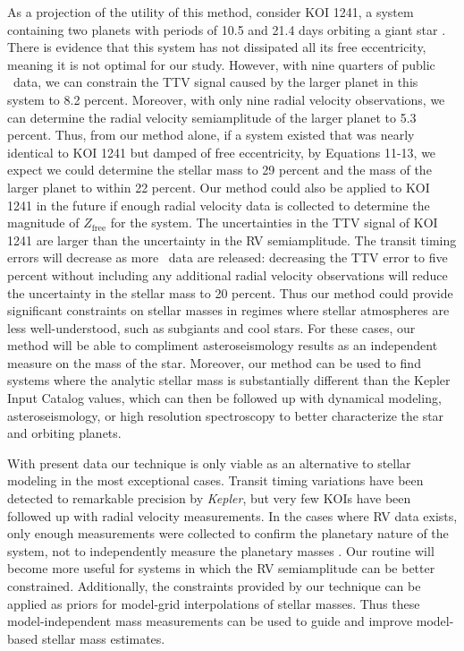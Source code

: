 As a projection of the utility of this method, consider KOI 1241, a system containing two planets with periods of 10.5 and 21.4 days orbiting a giant star \citep[$R = 3.14 R_\odot$,][]{Steffen13}. There is evidence that this system has not dissipated all its free eccentricity, meaning it is not optimal for our study. However, with nine quarters of public \kep\ data, we can constrain the TTV signal caused by the larger planet in this system to 8.2 percent. Moreover, with only nine radial velocity observations, we can determine the radial velocity semiamplitude of the larger planet to 5.3 percent. Thus, from our method alone, if a system existed that was nearly identical to KOI 1241 but damped of free eccentricity, by Equations 11-13, we expect we could determine the stellar mass to 29 percent and the mass of the larger planet to within 22 percent. Our method could also be applied to KOI 1241 in the future if enough radial velocity data is collected to determine the magnitude of $Z_\textrm{free}$ for the system. The uncertainties in the TTV signal of KOI 1241 are larger than the uncertainty in the RV semiamplitude. The transit timing errors will decrease as more \kep\ data are released: decreasing the TTV error to five percent without including any additional radial velocity observations will reduce the uncertainty in the stellar mass to 20 percent. Thus our method could provide significant constraints on stellar masses in regimes where stellar atmospheres are less well-understood, such as subgiants and cool stars. For these cases, our method will be able to compliment asteroseismology results as an independent measure on the mass of the star. Moreover, our method can be used to find systems where the analytic stellar mass is substantially different than the Kepler Input Catalog values, which can then be followed up with dynamical modeling, asteroseismology, or high resolution spectroscopy to better characterize the star and orbiting planets.

With present data our technique is only viable as an alternative to stellar modeling in the most exceptional cases. Transit timing variations have been detected to remarkable precision by \textit{Kepler}, but very few KOIs have been followed up with radial velocity measurements. In the cases where RV data exists, only enough measurements were collected to confirm the planetary nature of the system, not to independently measure the planetary masses \citep{Holman10}. Our routine will become more useful for systems in which the RV semiamplitude can be better constrained. Additionally, the constraints provided by our technique can be applied as priors for model-grid interpolations of stellar masses. Thus these model-independent mass measurements can be used to guide and improve model-based stellar mass estimates.

